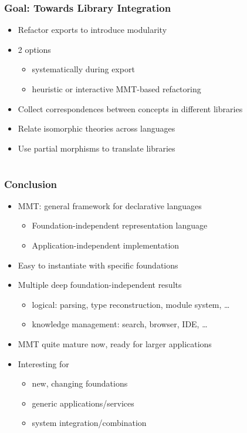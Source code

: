 \documentclass{beamer}
\begin{document}
\begin{frame}\frametitle{Goal: Towards Library Integration}
\begin{itemize}
\item Refactor exports to introduce modularity
\item 2 options
 \begin{itemize}
  \item systematically during export
  \item heuristic or interactive MMT-based refactoring
 \end{itemize}
\item Collect correspondences between concepts in different libraries
\item Relate isomorphic theories across languages 
\item Use partial morphisms to translate libraries
\end{itemize}
\end{frame}

\section{}

\begin{frame}\frametitle{Conclusion}
\begin{itemize}
\item MMT: general framework for declarative languages
  \begin{itemize}
     \item Foundation-independent representation language
     \item Application-independent implementation
  \end{itemize}
\item Easy to instantiate with specific foundations
\item Multiple deep foundation-independent results
   \begin{itemize}
   \item logical: parsing, type reconstruction, module system, \ldots
   \item knowledge management: search, browser, IDE, \ldots
   \end{itemize}
\item MMT quite mature now, ready for larger applications 
\item Interesting for
 \begin{itemize}
  \item new, changing foundations
  \item generic applications/services
  \item system integration/combination
 \end{itemize}
\end{itemize}
\end{frame}
\end{document}
